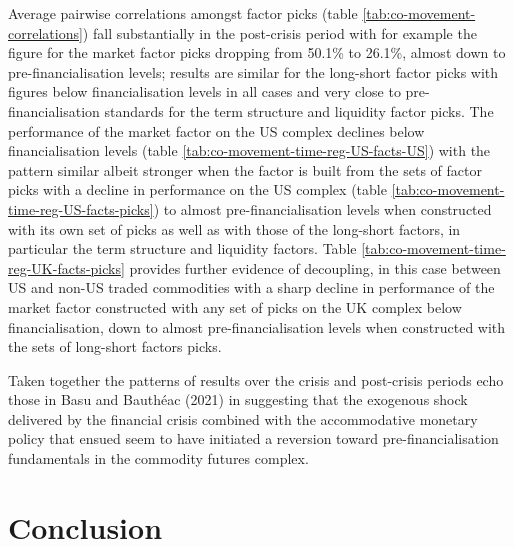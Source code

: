 \documentclass[]{elsarticle} %
\begin{document}
Average pairwise correlations amongst factor picks (table \ref{tab:co-movement-correlations}) fall substantially in the post-crisis period with for example the figure for the market factor picks dropping from 50.1\% to 26.1\%, almost down to pre-financialisation levels; results are similar for the long-short factor picks with figures below financialisation levels in all cases and very close to pre-financialisation standards for the term structure and liquidity factor picks. The performance of the market factor on the US complex declines below financialisation levels (table \ref{tab:co-movement-time-reg-US-facts-US}) with the pattern similar albeit stronger when the factor is built from the sets of factor picks with a decline in performance on the US complex (table \ref{tab:co-movement-time-reg-US-facts-picks}) to almost pre-financialisation levels when constructed with its own set of picks as well as with those of the long-short factors, in particular the term structure and liquidity factors. Table \ref{tab:co-movement-time-reg-UK-facts-picks} provides further evidence of decoupling, in this case between US and non-US traded commodities with a sharp decline in performance of the market factor constructed with any set of picks on the UK complex below financialisation, down to almost pre-financialisation levels when constructed with the sets of long-short factors picks.

\medskip\setlength{\parindent}{0pt}

Taken together the patterns of results over the crisis and post-crisis periods echo those in Basu and Bauthéac (2021) in suggesting that the exogenous shock delivered by the financial crisis combined with the accommodative monetary policy that ensued seem to have initiated a reversion toward pre-financialisation fundamentals in the commodity futures complex.

\newpage

\hypertarget{conclusion}{%
\section{Conclusion}\label{conclusion}}
\end{document}
